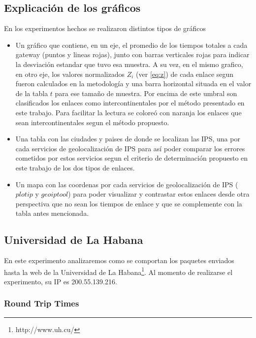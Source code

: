 \subsection{Explicación de los gráficos}

En los experimentos hechos se realizaron distintos tipos de gráficos

\begin{itemize}
	\item Un gráfico que contiene, en un eje, el promedio de los tiempos totales
	a cada gateway (puntos y lineas rojas), junto con barras verticales rojas
	para indicar la desviación estandar que tuvo esa muestra. A su vez, en el
	mismo grafico, en otro eje, los valores normalizados $Z_{i}$ (ver
	\ref{eq:z}) de cada enlace segun fueron calculados en la metodología y una
	barra horizontal situada en el valor de la tabla $t$ para ese tamaño de
	muestra.  Por encima de este umbral son clasificados los enlaces como
	intercontinentales por el método presentado en este trabajo.  Para
	facilitar la lectura se coloreó con naranja los enlaces que sean
	intercontinentales segun el método propuesto.

	\item Una tabla con las ciudades y paises de donde se localizan las IPS,
	una por cada servicios de geolocalización de IPS para así poder comparar
	los errores cometidos por estos servicios segun el criterio de
	determinación propuesto en este trabajo de los dos tipos de enlaces.

	\item Un mapa con las coordenas por cada servicios de geolocalización de
	IPS ($plotip$ y $geoiptool$) para poder visualizar y contrastar estos
	enlaces desde otra perspectiva que no sean los tiempos de enlace y que
	se complemente con la tabla antes mencionada.
\end{itemize}


\clearpage

\subsection{Universidad de La Habana}

En este experimento analizaremos como se comportan los paquetes enviados hasta
la web de la Universidad de La Habana\footnote{http://www.uh.cu/}. Al momento
de realizarse el experimento, su IP es 200.55.139.216.

\subsubsection{Round Trip Times}

